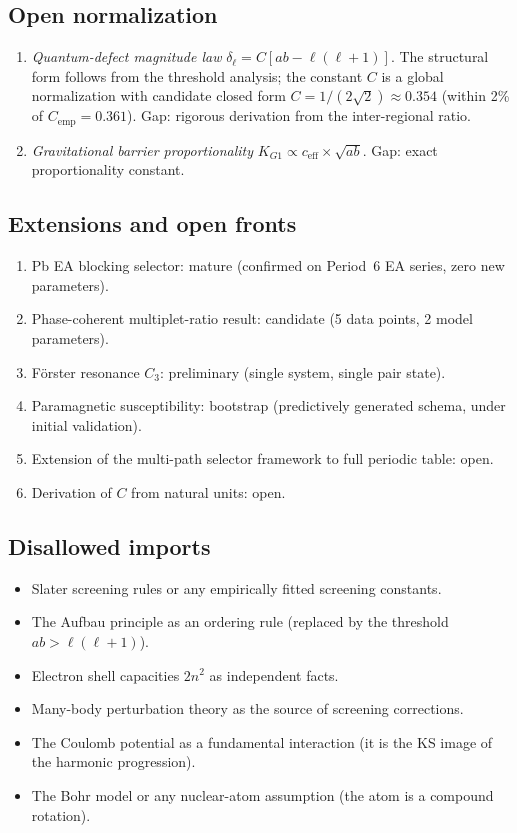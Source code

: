 \documentclass[11pt,a4paper]{article}
\begin{document}
\subsection{Open normalization}

\begin{enumerate}
\item \emph{Quantum-defect magnitude law} $\delta_\ell = C[ab - \ell(\ell+1)]$. The structural form follows from the threshold analysis; the constant $C$ is a global normalization with candidate closed form $C = 1/(2\sqrt{2}) \approx 0.354$ (within 2\% of $C_{\mathrm{emp}} = 0.361$). Gap: rigorous derivation from the inter-regional ratio.
\item \emph{Gravitational barrier proportionality} $K_{G1} \propto c_{\mathrm{eff}} \times \sqrt{ab}$. Gap: exact proportionality constant.
\end{enumerate}

\subsection{Extensions and open fronts}

\begin{enumerate}
\item Pb EA blocking selector: mature (confirmed on Period~6 EA series, zero new parameters).
\item Phase-coherent multiplet-ratio result: candidate (5 data points, 2 model parameters).
\item F\"orster resonance $C_3$: preliminary (single system, single pair state).
\item Paramagnetic susceptibility: bootstrap (predictively generated schema, under initial validation).
\item Extension of the multi-path selector framework to full periodic table: open.
\item Derivation of $C$ from natural units: open.
\end{enumerate}

\subsection{Disallowed imports}

\begin{itemize}
\item Slater screening rules or any empirically fitted screening constants.
\item The Aufbau principle as an ordering rule (replaced by the threshold $ab > \ell(\ell+1)$).
\item Electron shell capacities $2n^2$ as independent facts.
\item Many-body perturbation theory as the source of screening corrections.
\item The Coulomb potential as a fundamental interaction (it is the KS image of the harmonic progression).
\item The Bohr model or any nuclear-atom assumption (the atom is a compound rotation).
\end{itemize}
\end{document}
